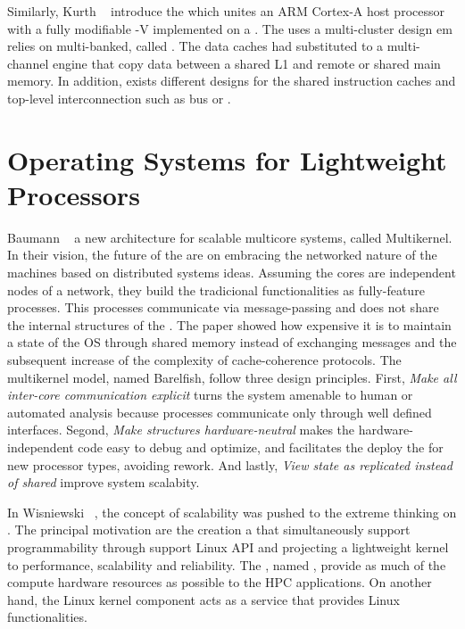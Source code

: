 	Similarly, Kurth \etal~\cite{Kurth2017} introduce the \hero which unites an ARM Cortex-A
	host processor with a fully modifiable \risc-V \manycore implemented on a \fpga.
	The \pmca uses a multi-cluster design em relies on multi-banked, called \spms.
	The data caches had substituted to a multi-channel \dma engine that copy data between a
	shared L1 \spm and remote \smps or shared main memory.
	In addition, exists different designs for the shared instruction caches and top-level
	interconnection such as bus or \noc.

\section{Operating Systems for Lightweight \manycore Processors}

	Baumann \etal~\cite{Baumann2009} a new \os architecture for scalable multicore systems,
	called Multikernel.
	In their vision, the future of the \oses are on embracing the networked nature of the
	machines based on distributed systems ideas.
	Assuming the cores are independent nodes of a network, they build the tradicional \os
	functionalities as fully-feature processes.
	This processes communicate via message-passing and does not share the internal structures
	of the \os.
	The paper showed how expensive it is to maintain a state of the OS through shared memory
	instead of exchanging messages and the subsequent increase of the complexity of
	cache-coherence protocols.
	The multikernel model, named Barelfish, follow three design principles.
	First, \textit{Make all inter-core communication explicit} turns the system amenable to
	human or automated analysis because processes communicate only through well defined interfaces.
	Segond, \textit{Make \os structures hardware-neutral} makes the hardware-independent code easy
	to debug and optimize, and facilitates the deploy the \os for new processor types, avoiding rework.
	And lastly, \textit{View \os state as replicated instead of shared} improve system scalabity.

	In Wisniewski~\cite{mos} \etal, the concept of scalability was pushed to the extreme thinking on \hpc.
	The principal motivation are the creation a \os that simultaneously support programmability
	through support Linux API and projecting a lightweight kernel to performance, scalability and reliability.
	The \os, named \mos, provide as much of the compute hardware resources as possible to the
	HPC applications. On another hand, the Linux kernel component acts as a service that provides
	Linux functionalities.
	
